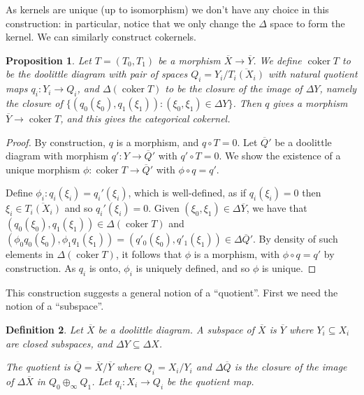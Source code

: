 \documentclass[a4paper,11pt]{article}
\theoremstyle{plain}
\newtheorem{proposition}{Proposition}[section]
\newtheorem{definition}[proposition]{Definition}
\theoremstyle{remark}
\newcommand{\coker}{\operatorname{coker}}
\begin{document}
As kernels are unique (up to isomorphism) we don't have any choice in this construction: in particular, notice that we only change the $\Delta$ space to form the kernel.  We can similarly construct cokernels.

\begin{proposition}
Let $T=(T_0,T_1)$ be a morphism $\overline X \to \overline Y$.  We define $\coker T$ to be the doolittle diagram with pair of spaces $Q_i = Y_i / \overline{T_i(X_i)}$ with natural quotient maps $q_i \colon Y_i \to Q_i$, and $\Delta(\coker T)$ to be the closure of the image of $\Delta Y$, namely the closure of $\{ (q_0(\xi_0), q_1(\xi_1)) : (\xi_0,\xi_1)\in\Delta Y \}$.  Then $q$ gives a morphism $\overline Y \to \coker T$, and this gives the categorical cokernel.
\end{proposition}
\begin{proof}
By construction, $q$ is a morphism, and $q \circ T = 0$.  Let $\overline Q'$ be a doolittle diagram with morphism $q' \colon Y \to \overline Q'$ with $q' \circ T = 0$.  We show the existence of a unique morphism $\phi \colon \coker T \to \overline Q'$ with $\phi\circ q = q'$.

Define $\phi_i \colon q_i(\xi_i) = q_i'(\xi_i)$, which is well-defined, as if $q_i(\xi_i)=0$ then $\xi_i\in \overline {T_i(X_i)}$ and so $q_i'(\xi_i)=0$.  Given $(\xi_0,\xi_1) \in \Delta\overline Y$, we have that $(q_0(\xi_0), q_1(\xi_1)) \in \Delta(\coker T)$ and $(\phi_0q_0(\xi_0), \phi_1q_1(\xi_1)) = (q'_0(\xi_0), q'_1(\xi_1)) \in \Delta\overline Q'$.  By density of such elements in $\Delta(\coker T)$, it follows that $\phi$ is a morphism, with $\phi\circ q = q'$ by construction.  As $q_i$ is onto, $\phi_i$ is uniquely defined, and so $\phi$ is unique.
\end{proof}

This construction suggests a general notion of a ``quotient''.  First we need the notion of a ``subspace''.

\begin{definition}
Let $\overline X$ be a doolittle diagram.  A \emph{subspace} of $\overline X$ is $\overline Y$ where $Y_i\subseteq X_i$ are closed subspaces, and $\Delta Y \subseteq \Delta X$.

The \emph{quotient} is $\overline Q = \overline X / \overline Y$ where $Q_i = X_i / Y_i$ and $\Delta\overline Q$ is the closure of the image of $\Delta\overline X$ in $Q_0 \oplus_\infty Q_1$.  Let $q_i \colon X_i \to Q_i$ be the quotient map.
\end{definition}
\end{document}
